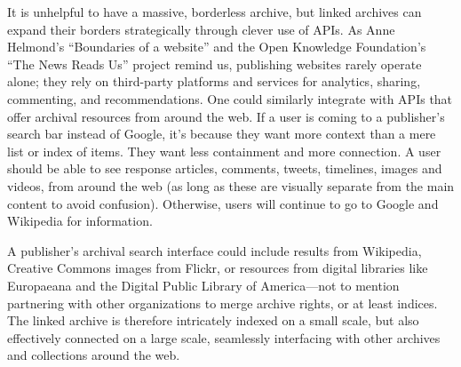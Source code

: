 It is unhelpful to have a massive, borderless archive, but linked archives can expand their borders strategically through clever use of APIs. As Anne Helmond's ``Boundaries of a website'' and the Open Knowledge Foundation's ``The News Reads Us'' project remind us, publishing websites rarely operate alone; they rely on third-party platforms and services for analytics, sharing, commenting, and recommendations.\autocite{helmond_exploring_2013,wehrmeyer_news_????} One could similarly integrate with APIs that offer archival resources from around the web. If a user is coming to a publisher's search bar instead of Google, it's because they want more context than a mere list or index of items. They want less containment and more connection. A user should be able to see response articles, comments, tweets, timelines, images and videos, from around the web (as long as these are visually separate from the main content to avoid confusion). Otherwise, users will continue to go to Google and Wikipedia for information.

A publisher's archival search interface could include results from Wikipedia, Creative Commons images from Flickr, or resources from digital libraries like Europaeana and the Digital Public Library of America---not to mention partnering with other organizations to merge archive rights, or at least indices. The linked archive is therefore intricately indexed on a small scale, but also effectively connected on a large scale, seamlessly interfacing with other archives and collections around the web.



